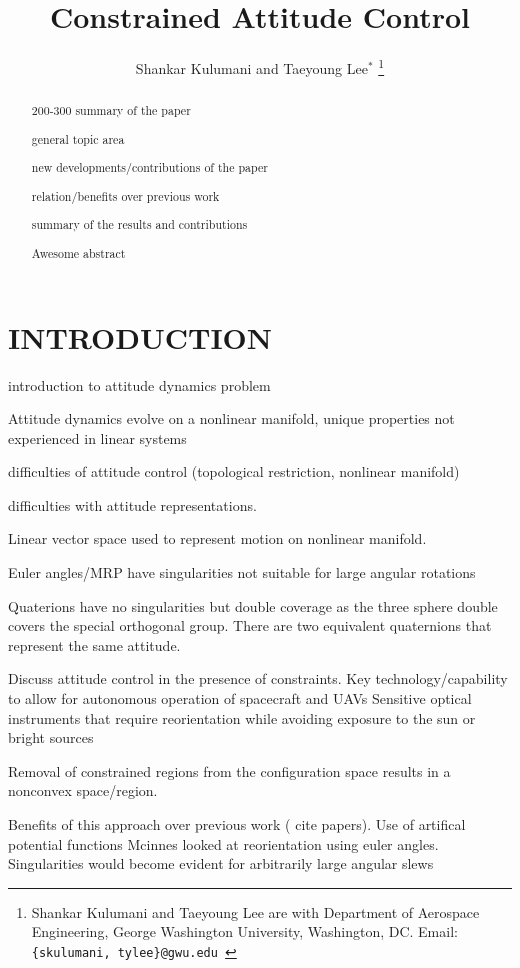 \documentclass[letterpaper, 10 pt, conference]{ieeeconf}  %
\title{\LARGE \bf
Constrained Attitude Control
}
\author{Shankar Kulumani and Taeyoung Lee$^*$
 \thanks{Shankar Kulumani and Taeyoung Lee are with Department of Aerospace Engineering, George Washington University, Washington, DC. Email: {\tt\footnotesize \{skulumani, tylee\}@gwu.edu }}
 }
\begin{document}
\maketitle
\thispagestyle{empty}
\pagestyle{empty}


\begin{abstract}

200-300 summary of the paper

general topic area

new developments/contributions of the paper

relation/benefits over previous work

summary of the results and contributions

Awesome abstract

\end{abstract}


\section{INTRODUCTION}
introduction to attitude dynamics problem

Attitude dynamics evolve on a nonlinear manifold, unique properties not experienced in linear systems

difficulties of attitude control (topological restriction, nonlinear manifold)

difficulties with attitude representations.

Linear vector space used to represent motion on nonlinear manifold. 

Euler angles/MRP have singularities not suitable for large angular rotations

Quaterions have no singularities but double coverage as the three sphere double covers the special orthogonal group.
There are two equivalent quaternions that represent the same attitude.

Discuss attitude control in the presence of constraints. 
Key technology/capability to allow for autonomous operation of spacecraft and UAVs
Sensitive optical instruments that require reorientation while avoiding exposure to the sun or bright sources

Removal of constrained regions from the configuration space results in a nonconvex space/region.

Benefits of this approach over previous work ( cite papers).
Use of artifical potential functions
Mcinnes looked at reorientation using euler angles. 
Singularities would become evident for arbitrarily large angular slews
\end{document}
